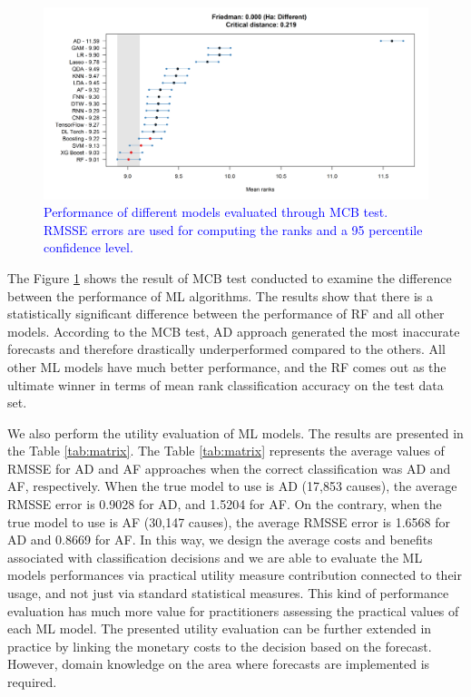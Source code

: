 \documentclass[preprint, 3p,
authoryear]{elsarticle} %
\begin{document}
\begin{figure}[H]

{\centering \includegraphics[width=1\linewidth]{img/300dpi/Fig_MCB_all(review)} 

}

\caption{\textcolor{blue}{Performance of different models evaluated through MCB test. RMSSE errors are used for computing the ranks and a 95 percentile confidence level.}}\label{fig:MCB_ML}
\end{figure}

The Figure \ref{fig:MCB_ML} shows the result of MCB test conducted to
examine the difference between the performance of ML algorithms. The
results show that there is a statistically significant difference
between the performance of RF and all other models. According to the MCB
test, AD approach generated the most inaccurate forecasts and therefore
drastically underperformed compared to the others. All other ML models
have much better performance, and the RF comes out as the ultimate
winner in terms of mean rank classification accuracy on the test data
set.

We also perform the utility evaluation of ML models. The results are
presented in the Table \ref{tab:matrix}. The Table \ref{tab:matrix}
represents the average values of RMSSE for AD and AF approaches when the
correct classification was AD and AF, respectively. When the true model
to use is AD (17,853 causes), the average RMSSE error is 0.9028 for AD,
and 1.5204 for AF. On the contrary, when the true model to use is AF
(30,147 causes), the average RMSSE error is 1.6568 for AD and 0.8669 for
AF. In this way, we design the average costs and benefits associated
with classification decisions and we are able to evaluate the ML models
performances via practical utility measure contribution connected to
their usage, and not just via standard statistical measures. This kind
of performance evaluation has much more value for practitioners
assessing the practical values of each ML model. The presented utility
evaluation can be further extended in practice by linking the monetary
costs to the decision based on the forecast. However, domain knowledge
on the area where forecasts are implemented is required.
\end{document}
